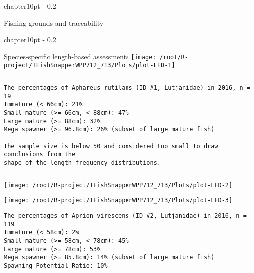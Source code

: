 \documentclass{report}\usepackage[]{graphicx}\usepackage[]{color}
\makeatletter
\def\maxwidth{ %
  \ifdim\Gin@nat@width>\linewidth
    \linewidth
  \else
    \Gin@nat@width
  \fi
}
\newenvironment{kframe}{%
 \def\at@end@of@kframe{}%
 \ifinner\ifhmode%
  \def\at@end@of@kframe{\end{minipage}}%
  \begin{minipage}{\columnwidth}%
 \fi\fi%
 \def\FrameCommand##1{\hskip\@totalleftmargin \hskip-\fboxsep
 \colorbox{shadecolor}{##1}\hskip-\fboxsep
     \hskip-\linewidth \hskip-\@totalleftmargin \hskip\columnwidth}%
 \MakeFramed {\advance\hsize-\width
   \@totalleftmargin\z@ \linewidth\hsize
   \@setminipage}}%
 {\par\unskip\endMakeFramed%
 \at@end@of@kframe}
\newenvironment{knitrout}{}{} %
\newcommand{\verbatimfont}[1]{\def\verbatim@font{#1}}%
\renewcommand\chapter{\@startsection%
{chapter}{1}{0pt}%
{-\baselineskip}%
{0.2\baselineskip}%
{\raggedright\bf}}%
\makeatother
\begin{document}
\newpage

\chapter{Fishing grounds and traceability}


\newpage

\chapter{Species-specific length-based assessments}
\verbatimfont{\normalfont\rmfamily}
\begin{knitrout}
\color{fgcolor}
\texttt{[image: /root/R-project/IFishSnapperWPP712\_713/Plots/plot-LFD-1]} 
\begin{kframe}\begin{verbatim}
\end{verbatim}
\end{kframe}
\clearpage
\newpage
\begin{kframe}\begin{verbatim}
The percentages of Aphareus rutilans (ID #1, Lutjanidae) in 2016, n = 19
Immature (< 66cm): 21%
Small mature (>= 66cm, < 88cm): 47%
Large mature (>= 88cm): 32%
Mega spawner (>= 96.8cm): 26% (subset of large mature fish)
 
The sample size is below 50 and considered too small to draw conclusions from the
shape of the length frequency distributions.
\end{verbatim}
\end{kframe}
\newpage
\begin{kframe}\begin{verbatim}
\end{verbatim}
\end{kframe}
\texttt{[image: /root/R-project/IFishSnapperWPP712\_713/Plots/plot-LFD-2]} 

\texttt{[image: /root/R-project/IFishSnapperWPP712\_713/Plots/plot-LFD-3]} 
\begin{kframe}\begin{verbatim}
The percentages of Aprion virescens (ID #2, Lutjanidae) in 2016, n = 119
Immature (< 58cm): 2%
Small mature (>= 58cm, < 78cm): 45%
Large mature (>= 78cm): 53%
Mega spawner (>= 85.8cm): 14% (subset of large mature fish)
Spawning Potential Ratio: 10%
 

\end{verbatim}
\end{kframe}
\end{knitrout}
\end{document}
